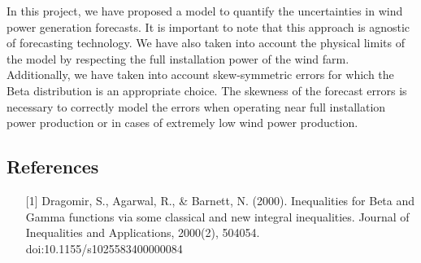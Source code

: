 \documentclass[10pt,twocolumn,letterpaper]{article}
\begin{document}
In this project, we have proposed a model to quantify the uncertainties in wind power generation forecasts. It is important to note that this approach is agnostic of forecasting technology. We have also taken into account the physical limits of the model by respecting the full installation power of the wind farm. Additionally, we have taken into account skew-symmetric errors for which the Beta distribution is an appropriate choice. The skewness of the forecast errors is necessary to correctly model the errors when operating near full installation power production or in cases of extremely low wind power production.

 



\subsection{References}

\begin{itemize}
\item[][1] Dragomir, S., Agarwal, R., \& Barnett, N. (2000). Inequalities for Beta and Gamma functions via some classical and new integral inequalities. Journal of Inequalities and Applications, 2000(2), 504054. doi:10.1155/s1025583400000084
\end{itemize}




{\small


}
\end{document}
